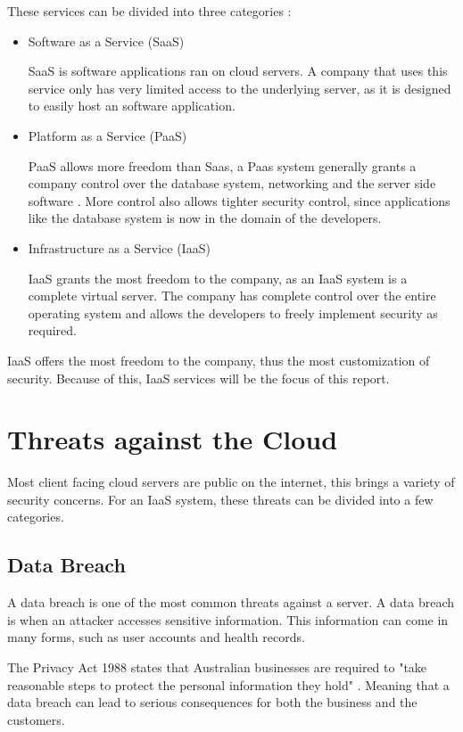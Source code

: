 These services can be divided into three categories \cite{ibm_ibm_2016}:
\begin{itemize}
    \item Software as a Service (SaaS)
    
    SaaS is software applications ran on cloud servers. A company that uses this service only has very limited access to the underlying server, as it is designed to easily host an software application.

    \item Platform as a Service (PaaS)

    PaaS allows more freedom than Saas, a Paas system generally grants a company control over the database system, networking and the server side software \cite{Interoute_what_2016}. More control also allows tighter security control, since applications like the database system is now in the domain of the developers.

    \item Infrastructure as a Service (IaaS)

    IaaS grants the most freedom to the company, as an IaaS system is a complete virtual server. The company has complete control over the entire operating system and allows the developers to freely implement security as required.
\end{itemize}

IaaS offers the most freedom to the company, thus the most customization of security. Because of this, IaaS services will be the focus of this report.

\section{Threats against the Cloud}

Most client facing cloud servers are public on the internet, this brings a variety of security concerns. For an IaaS system, these threats can be divided into a few categories.

\subsection{Data Breach}

A data breach is one of the most common threats against a server. A data breach is when an attacker accesses sensitive information. This information can come in many forms, such as user accounts and health records. 

The Privacy Act 1988 states that Australian businesses are required to "take reasonable steps to protect the personal information they hold" \cite{office_of_the_australia_information_commissioner_rights_2016}. Meaning that a data breach can lead to serious consequences for both the business and the customers.

